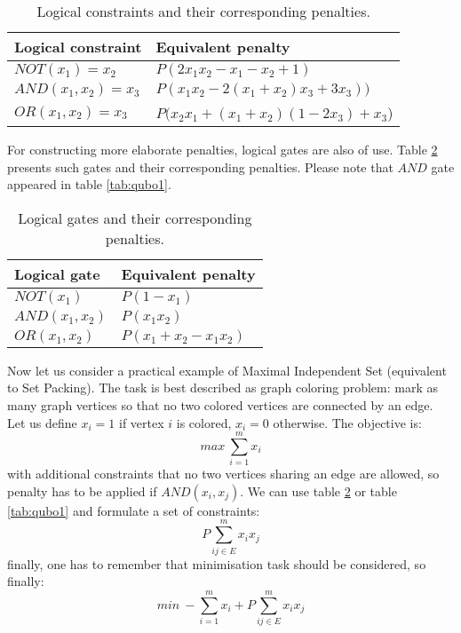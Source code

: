 \begin{table}[h]
\begin{center}
\begin{tabular}{ l l }
 Logical constraint & Equivalent penalty\\
  \hline 
 $NOT(x_1)=x_2$ & $P(2x_1x_2-x_1-x_2+1)$ \\  
 $AND(x_1, x_2)=x_3$ & $P(x_1x_2 - 2(x_1 + x_2)x_3 + 3x_3))$ \\
 $OR(x_1, x_2)=x_3$ & $P(x_2x_1 + (x_1+x_2)(1-2x_3)+x_3$) \\
\end{tabular}
\end{center}
\caption{Logical constraints and their corresponding penalties\cite{tanahashi_application_2019}\cite{zaman_pyqubo_2021}.}
\label{tab:qubo2}
\end{table}


For constructing more elaborate penalties, logical gates are also of use. Table \ref{tab:qubo3} presents such gates and their corresponding penalties. Please note that $AND$ gate appeared in table \ref{tab:qubo1}.
\begin{table}[h]
\begin{center}
\begin{tabular}{ l l }
 Logical gate & Equivalent penalty\\
 \hline
 $NOT(x_1)$ & $P(1-x_1)$ \\  
 $AND(x_1, x_2)$ & $P(x_1x_2)$ \\
 $OR(x_1, x_2)$ & $P(x_1+x_2-x_1x_2)$\\
\end{tabular}
\end{center}
\caption{Logical gates and their corresponding penalties\cite{tanahashi_application_2019}\cite{zaman_pyqubo_2021}.}
\label{tab:qubo3}
\end{table}

Now let us consider a practical example of Maximal Independent Set (equivalent to Set Packing). The task is best described as graph coloring problem: mark as many graph vertices so that no two colored vertices are connected by an edge. Let us define $x_i=1$ if vertex $i$ is colored, $x_i=0$ otherwise. The objective is:
\[max\ \sum_{i=1}^mx_i\]
with additional constraints that no two vertices sharing an edge are allowed, so penalty has to be applied if $AND(x_i, x_j)$. We can use table \ref{tab:qubo3} or table \ref{tab:qubo1} and formulate a set of constraints:
\[P\sum_{ij\in E}^m x_i x_j \]
finally, one has to remember that minimisation task should be considered, so finally:
\[min\ -\sum_{i=1}^mx_i + P\sum_{ij\in E}^m x_i x_j\]

